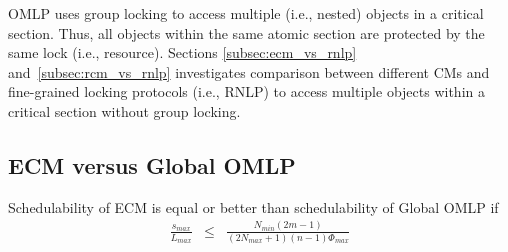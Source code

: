 OMLP uses group locking to access multiple (i.e., nested) objects
in a critical section. Thus, all objects within the same atomic section are protected by the same lock (i.e., resource). Sections \ref{subsec:ecm_vs_rnlp} and~\ref{subsec:rcm_vs_rnlp} investigates comparison between different CMs and fine-grained locking protocols (i.e., RNLP) to access multiple objects within a critical section without group locking.
%
\subsection{ECM versus Global OMLP}\label{subsec:ecm_vs_omlp}
%
\begin{clm}\label{clm:ecm_vs_omlp}
%
Schedulability of ECM is equal or
better than schedulability of Global OMLP if 
\begin{eqnarray}
\frac{s_{max}}{L_{max}} & \le & \frac{N_{min}\left(2m-1\right)}{\left(2N_{max}+1\right)(n-1)\Phi_{max}}\label{eq:ecm_omlp_cmp_final}
\end{eqnarray}
%
\end{clm}
%
